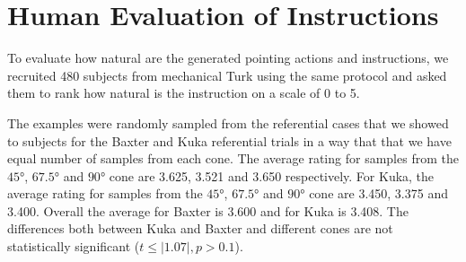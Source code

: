 \section{Human Evaluation of Instructions}

To evaluate how natural are the generated pointing actions and instructions, we recruited 480 subjects from mechanical Turk using the same protocol and asked them to rank how natural is the instruction on a scale of 0 to 5. 


The examples were randomly sampled from the referential cases that we showed to subjects for the Baxter and Kuka referential trials in a way that that we have equal number of samples from each cone. The average rating for samples from the $\ang{45}$, $\ang{67.5}$ and $\ang{90}$ cone are 3.625, 3.521
and 3.650 respectively. For Kuka, the average rating for samples from the $\ang{45}$, $\ang{67.5}$ and $\ang{90}$ cone are 3.450, 3.375 and 3.400. Overall the average for Baxter is 3.600 and for Kuka is 3.408. The differences both between Kuka and Baxter and different cones are not statistically significant ($t \leq |1.07|, p > 0.1 $).

